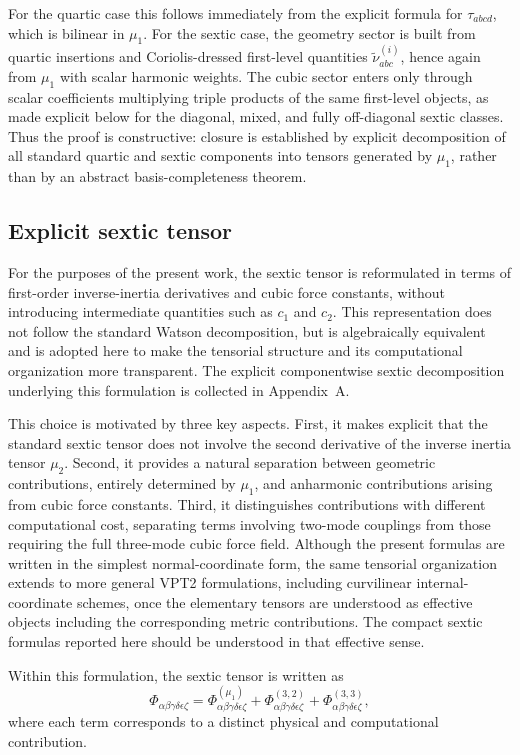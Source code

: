 \documentclass[aip,jcp,reprint,floatfix]{revtex4-2}
\begin{document}
For the quartic case this follows immediately from the explicit formula
for $\tau_{abcd}$, which is bilinear in $\mu_1$. For the sextic case,
the geometry sector is built from quartic insertions and Coriolis-dressed
first-level quantities $\widetilde{\nu}^{(i)}_{abc}$, hence again from
$\mu_1$ with scalar harmonic weights. The cubic sector enters only
through scalar coefficients multiplying triple products of the same
first-level objects, as made explicit below for the diagonal, mixed,
and fully off-diagonal sextic classes. Thus the proof is constructive:
closure is established by explicit decomposition of all standard quartic
and sextic components into tensors generated by $\mu_1$, rather than by
an abstract basis-completeness theorem.


\subsection{Explicit sextic tensor}

For the purposes of the present work, the sextic tensor is reformulated
in terms of first-order inverse-inertia derivatives and cubic force
constants, without introducing intermediate quantities such as $c_1$
and $c_2$.\cite{Watson1968} This representation does not follow the
standard Watson decomposition, but is algebraically equivalent and is
adopted here to make the tensorial structure and its computational
organization more transparent. The explicit componentwise sextic
decomposition underlying this formulation is collected in
Appendix~A.

This choice is motivated by three key aspects. First, it makes explicit
that the standard sextic tensor does not involve the second derivative
of the inverse inertia tensor $\mu_2$. Second, it provides a natural
separation between geometric contributions, entirely determined by
$\mu_1$, and anharmonic contributions arising from cubic force
constants. Third, it distinguishes contributions with different
computational cost, separating terms involving two-mode couplings from
those requiring the full three-mode cubic force field.
Although the present formulas are written in the simplest
normal-coordinate form, the same tensorial organization extends to more
general VPT2 formulations, including curvilinear internal-coordinate
schemes, once the elementary tensors are understood as effective
objects including the corresponding metric contributions. The compact
sextic formulas reported here should be understood in that effective
sense.

Within this formulation, the sextic tensor is written as
\begin{equation}
\Phi_{\alpha\beta\gamma\delta\epsilon\zeta}
=
\Phi^{(\mu_1)}_{\alpha\beta\gamma\delta\epsilon\zeta}
+
\Phi^{(3,2)}_{\alpha\beta\gamma\delta\epsilon\zeta}
+
\Phi^{(3,3)}_{\alpha\beta\gamma\delta\epsilon\zeta},
\end{equation}
where each term corresponds to a distinct physical and computational
contribution.
\end{document}
